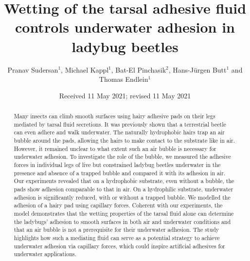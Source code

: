 \documentclass[vruler,JEB]{COB}%
\begin{document}

\title{Wetting of the tarsal adhesive fluid controls underwater adhesion in ladybug beetles}

\author{Pranav Sudersan$^{1}$, Michael Kappl$^{1}$, Bat-El Pinchasik$^{2}$, Hans-J\"{u}rgen Butt$^{1}$ and Thomas Endlein$^{1}$}

\address{
}


\date{Received 11 May 2021; revised 11 May 2021} %

\maketitle

\begin{abstract}
Many insects can climb smooth surfaces using hairy adhesive pads on their legs mediated by tarsal fluid secretions. It was previously shown that a terrestrial beetle can even adhere and walk underwater. The naturally hydrophobic hairs trap an air bubble around the pads, allowing the hairs to make contact to the substrate like in air. However, it remained unclear to what extent such an air bubble is necessary for underwater adhesion. To investigate the role of the bubble, we measured the adhesive forces in individual legs of live but constrained ladybug beetles underwater in the presence and absence of a trapped bubble and compared it with its adhesion in air. Our experiments revealed that on a hydrophobic substrate, even without a bubble, the pads show adhesion comparable to that in air. On a hydrophilic substrate, underwater adhesion is significantly reduced, with or without a trapped bubble. We modelled the adhesion of a hairy pad using capillary forces. Coherent with our experiments, the model demonstrates that the wetting properties of the tarsal fluid alone can determine the ladybugs'  adhesion to smooth surfaces in both air and underwater conditions and that an air bubble is not a prerequisite for their underwater adhesion. The study highlights how such a mediating fluid can serve as a potential strategy to achieve underwater adhesion via capillary forces, which could inspire artificial adhesives for underwater applications.
\end{abstract}
\end{document}
